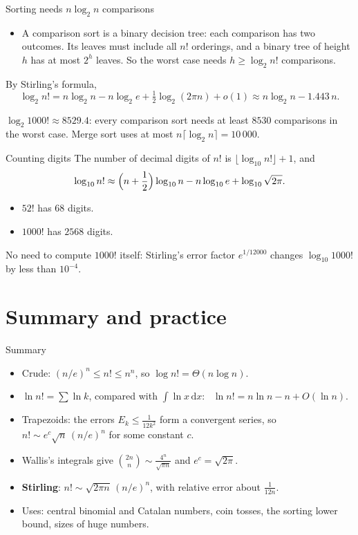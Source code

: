 \documentclass[10pt]{wosm-slides}
\newcommand{\dx}{\,\mathrm{d}x}
\begin{document}
\begin{frame}{Sorting needs $n \log_2 n$ comparisons}
  \begin{itemize}
    \item A comparison sort is a binary decision tree: each comparison has two outcomes.
      Its leaves must include all $n!$ orderings, and a binary tree of height $h$ has at most
      $2^h$ leaves. So the worst case needs $h \ge \log_2 n!$ comparisons.
  \end{itemize}
  \pause
  By Stirling's formula,
  \[ \log_2 n! = n \log_2 n - n \log_2 e + \tfrac12 \log_2(2\pi n) + o(1)
     \approx n \log_2 n - 1.443\, n . \]
  \pause
  \begin{example}[$n = 1000$]
    $\log_2 1000! \approx 8529.4$: every comparison sort needs at least $8530$ comparisons in the
    worst case. Merge sort uses at most $n \lceil \log_2 n \rceil = 10\,000$.
  \end{example}
\end{frame}

\begin{frame}{Counting digits}
  The number of decimal digits of $n!$ is $\lfloor \log_{10} n! \rfloor + 1$, and
  \[ \log_{10} n! \approx \Bigl(n + \frac12\Bigr)\log_{10} n - n \log_{10} e + \log_{10}\sqrt{2\pi} . \]
  \pause
  \begin{itemize}
    \item $52!$ has $68$ digits.
    \item $1000!$ has $2568$ digits.
  \end{itemize}
  \pause
  {\small No need to compute $1000!$ itself: Stirling's error factor $e^{1/12000}$ changes
  $\log_{10} 1000!$ by less than $10^{-4}$.\par}
\end{frame}

\section{Summary and practice}

\begin{frame}{Summary}
  \begin{itemize}
    \item Crude: $(n/e)^n \le n! \le n^n$, so $\log n! = \Theta(n \log n)$.
    \item $\ln n! = \sum \ln k$, compared with $\int \ln x \dx$: \ $\ln n! = n \ln n - n + O(\ln n)$.
    \item Trapezoids: the errors $E_k \le \frac{1}{12k^2}$ form a convergent series, so
      $n! \sim e^c \sqrt n\,(n/e)^n$ for some constant $c$.
    \item Wallis's integrals give $\binom{2n}{n} \sim \frac{4^n}{\sqrt{\pi n}}$ and $e^c = \sqrt{2\pi}$.
    \item \textbf{Stirling}: $n! \sim \sqrt{2\pi n}\,(n/e)^n$, with relative error about $\frac{1}{12n}$.
    \item Uses: central binomial and Catalan numbers, coin tosses, the sorting lower bound,
      sizes of huge numbers.
  \end{itemize}
\end{frame}
\end{document}
